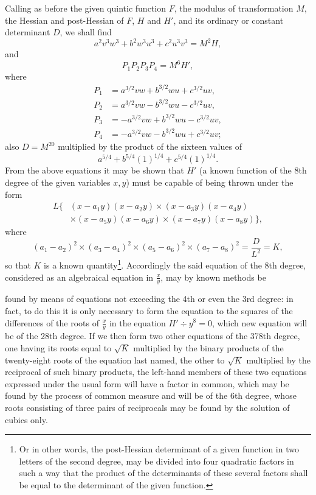 \documentclass[11pt]{article}
\newcommand{\sourcepage}[1]{\marginpar{\scriptsize p.~#1}}
\begin{document}
{{Calling as before the given quintic function $F$, the modulus of transformation $M$, the Hessian and post-Hessian of $F$, $H$ and $H'$, and its ordinary or constant determinant $D$, we shall find
\[
 a^2v^3w^3+b^2w^3u^3+c^2u^3v^3=M^2H,
\]
and
\[
 P_1P_2P_3P_4=M^6H',
\]
where
\[
\begin{aligned}
P_1&=a^{3/2}vw+b^{3/2}wu+c^{3/2}uv,\\
P_2&=a^{3/2}vw-b^{3/2}wu-c^{3/2}uv,\\
P_3&=-a^{3/2}vw+b^{3/2}wu-c^{3/2}uv,\\
P_4&=-a^{3/2}vw-b^{3/2}wu+c^{3/2}uv;
\end{aligned}
\]
also $D=M^{20}$ multiplied by the product of the sixteen values of
\[
 a^{5/4}+b^{5/4}(1)^{1/4}+c^{5/4}(1)^{1/4}.
\]
From the above equations it may be shown that $H'$ (a known function of the 8th degree of the given variables $x,y$) must be capable of being thrown under the form
\[
\begin{aligned}
L\{&(x-a_1y)(x-a_2y)\times(x-a_3y)(x-a_4y)\\
&\times(x-a_5y)(x-a_6y)\times(x-a_7y)(x-a_8y)\},
\end{aligned}
\]
where
\[
 (a_1-a_2)^2\times(a_3-a_4)^2\times(a_5-a_6)^2\times(a_7-a_8)^2
 =\frac{D}{L^2}=K,
\]
so that $K$ is a known quantity\footnote{Or in other words, the post-Hessian determinant of a given function in two letters of the second degree, may be divided into four quadratic factors in such a way that the product of the determinants of these several factors shall be equal to the determinant of the given function.}. Accordingly the said equation of the 8th degree, considered as an algebraical equation in $\frac{x}{y}$, may by known methods be

\sourcepage{194}
found by means of equations not exceeding the 4th or even the 3rd degree: in fact, to do this it is only necessary to form the equation to the squares of the differences of the roots of $\frac{x}{y}$ in the equation $H'\div y^8=0$, which new equation will be of the 28th degree. If we then form two other equations of the 378th degree, one having its roots equal to $\sqrt K$ multiplied by the binary products of the twenty-eight roots of the equation last named, the other to $\sqrt K$ multiplied by the reciprocal of such binary products, the left-hand members of these two equations expressed under the usual form will have a factor in common, which may be found by the process of common measure and will be of the 6th degree, whose roots consisting of three pairs of reciprocals may be found by the solution of cubics only.

}}
\end{document}
